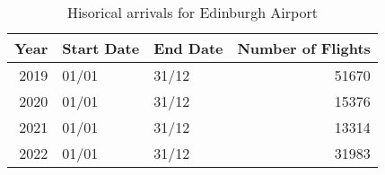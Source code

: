\begin{table}[ht]
\centering
\begin{tabular}{rllr}
  \hline
{\textbf{Year}} & {\textbf{Start Date}} & {\textbf{End Date}} & {\textbf{Number of Flights}} \\ 
  \hline
2019 & 01/01 & 31/12 & 51670 \\ 
  2020 & 01/01 & 31/12 & 15376 \\ 
  2021 & 01/01 & 31/12 & 13314 \\ 
  2022 & 01/01 & 31/12 & 31983 \\ 
   \hline
\end{tabular}
\caption{Hisorical arrivals for Edinburgh Airport \label{tab:observed_schedule}} 
\end{table}
